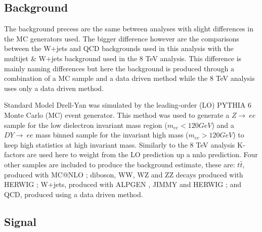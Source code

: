 \subsection*{Background}

	The background precess are the same between analyses with slight differences in the MC generators used. The bigger difference however are the comparisons between the W+jets and QCD backgrounds used in this analysis with the multijet \& W+jets background used in the 8 TeV analysis. This difference is mainly naming differences but here the background is produced through a combination of a MC sample and a data driven method while the 8 TeV analysis uses only a data driven method. 

	Standard Model Drell-Yan was simulated by the leading-order (LO) PYTHIA 6 \cite{} Monte Carlo (MC) event generator. This method was used to generate a $Z\rightarrow~ee$ sample for the low dielectron invariant mass region ($m_{ee} < 120 GeV$) and a $DY\rightarrow~ee$ mass binned sample for the invariant high mass ($m_{ee} > 120 GeV$) to keep high statistics at high invariant mass. Similarly to the 8 TeV analysis K-factors are used here to weight from the LO prediction up a nnlo prediction. Four other samples are included to produce the background estimate, these are: $t\bar{t}$, produced with MC@NLO \cite{}; diboson, WW, WZ and ZZ decays produced with HERWIG \cite{}; W+jets, produced with ALPGEN \cite{}, JIMMY \cite{} and HERWIG \cite{}; and QCD, produced using a data driven method.

\subsection*{Signal} 

